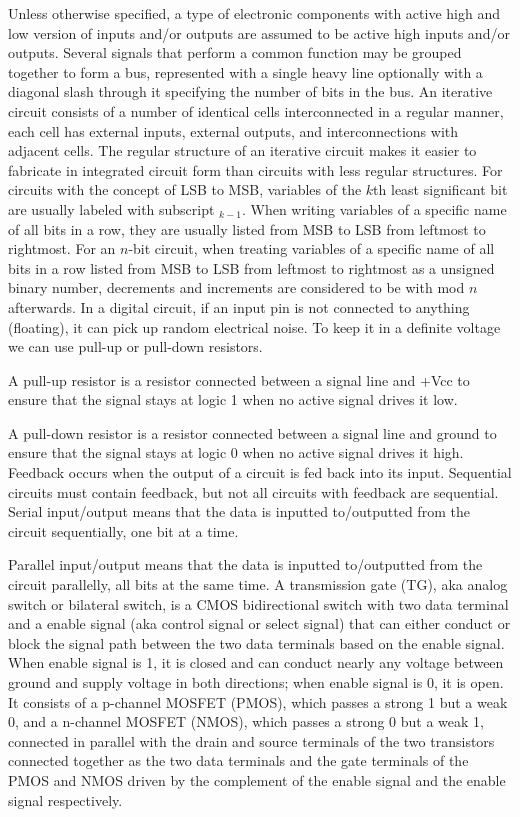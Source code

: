 \documentclass[a4paper,12pt]{report}
\begin{document}
Unless otherwise specified, a type of electronic components with active high and low version of inputs and/or outputs are assumed to be active high inputs and/or outputs.
Several signals that perform a common function may be grouped together to form a bus, represented with a single heavy line optionally with a diagonal slash through it specifying the number of bits in the bus.
An iterative circuit consists of a number of identical cells interconnected in a regular manner, each cell has external inputs, external outputs, and interconnections with adjacent cells. The regular structure of an iterative circuit makes it easier to fabricate in integrated circuit form than circuits with less regular structures.
For circuits with the concept of LSB to MSB, variables of the $k$th least significant bit are usually labeled with subscript $_{k-1}$. When writing variables of a specific name of all bits in a row, they are usually listed from MSB to LSB from leftmost to rightmost. For an $n$-bit circuit, when treating variables of a specific name of all bits in a row listed from MSB to LSB from leftmost to rightmost as a unsigned binary number, decrements and increments are considered to be with mod $n$ afterwards.
In a digital circuit, if an input pin is not connected to anything (floating), it can pick up random electrical noise. To keep it in a definite voltage we can use pull-up or pull-down resistors.

A pull-up resistor is a resistor connected between a signal line and +Vcc to ensure that the signal stays at logic 1 when no active signal drives it low.

A pull-down resistor is a resistor connected between a signal line and ground to ensure that the signal stays at logic 0 when no active signal drives it high.
Feedback occurs when the output of a circuit is fed back into its input. Sequential circuits must contain feedback, but not all circuits with feedback are sequential.
Serial input/output means that the data is inputted to/outputted from the circuit sequentially, one bit at a time.

Parallel input/output means that the data is inputted to/outputted from the circuit parallelly, all bits at the same time.
A transmission gate (TG), aka analog switch or bilateral switch, is a CMOS bidirectional switch with two data terminal and a enable signal (aka control signal or select signal) that can either conduct or block the signal path between the two data terminals based on the enable signal. When enable signal is 1, it is closed and can conduct nearly any voltage between ground and supply voltage in both directions; when enable signal is 0, it is open. It consists of a p-channel MOSFET (PMOS), which passes a strong 1 but a weak 0, and a n-channel MOSFET (NMOS), which passes a strong 0 but a weak 1, connected in parallel with the drain and source terminals of the two transistors connected together as the two data terminals and the gate terminals of the PMOS and NMOS driven by the complement of the enable signal and the enable signal respectively.
\end{document}
